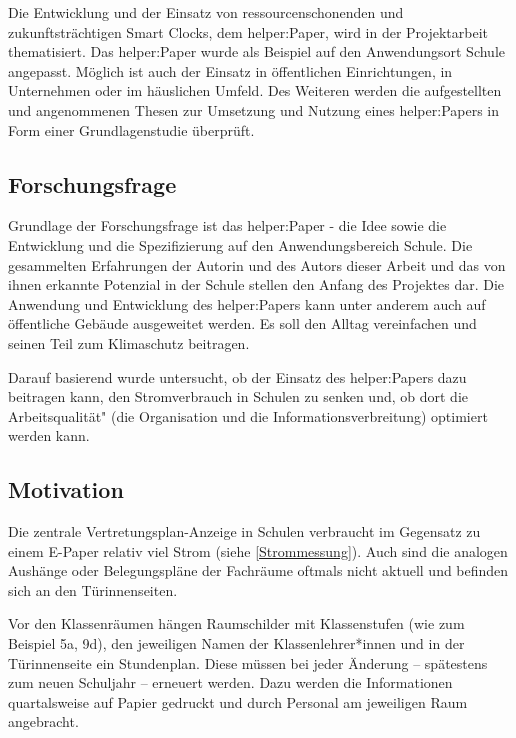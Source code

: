 \documentclass[10pt]{article}
\begin{document}
Die Entwicklung und der Einsatz von ressourcenschonenden und zukunftsträchtigen Smart Clocks, dem helper:Paper, wird in der Projektarbeit thematisiert. Das helper:Paper wurde als Beispiel auf den Anwendungsort Schule angepasst. Möglich ist auch der Einsatz in öffentlichen Einrichtungen, in Unternehmen oder im häuslichen Umfeld.
Des Weiteren werden die aufgestellten und angenommenen Thesen zur Umsetzung und Nutzung eines helper:Papers in Form einer Grundlagenstudie überprüft.

\subsection{Forschungsfrage}
Grundlage der Forschungsfrage ist das helper:Paper - die Idee sowie die Entwicklung und die Spezifizierung auf den Anwendungsbereich Schule. Die gesammelten Erfahrungen der Autorin und des Autors dieser Arbeit und das von ihnen erkannte Potenzial in der Schule stellen den Anfang des Projektes dar. Die Anwendung und Entwicklung des helper:Papers kann unter anderem auch auf öffentliche Gebäude ausgeweitet werden. Es soll den Alltag vereinfachen und seinen Teil zum Klimaschutz beitragen. 

Darauf basierend wurde untersucht, ob der Einsatz des helper:Papers dazu beitragen kann, den Stromverbrauch in Schulen zu senken und, ob dort die \glqq Arbeitsqualität" (die Organisation und die Informationsverbreitung) optimiert werden kann. \label{Verbesserung Arbeitsqualität?}

\subsection{Motivation}
Die zentrale Vertretungsplan-Anzeige in Schulen verbraucht im Gegensatz zu einem E-Paper relativ viel Strom (siehe \ref{Strommessung}). Auch sind die analogen Aushänge oder Belegungspläne der Fachräume oftmals nicht aktuell und befinden sich an den Türinnenseiten. 

Vor den Klassenräumen hängen Raumschilder mit Klassenstufen (wie zum Beispiel 5a, 9d), den jeweiligen Namen der Klassenlehrer*innen und in der Türinnenseite ein Stundenplan. Diese müssen bei jeder Änderung – spätestens zum neuen Schuljahr – erneuert werden. Dazu werden die Informationen quartalsweise auf Papier gedruckt und durch Personal am jeweiligen Raum angebracht.
\end{document}
